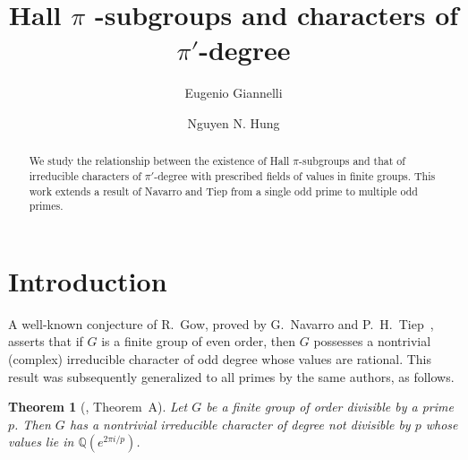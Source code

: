 \documentclass[12pt]{amsart}
\title[Hall $\pi$-subgroups and characters of $\pi'$-degree]{Hall $\pi$%
-subgroups and characters %
of $\pi'$-degree}
\author[Eugenio Giannelli]{Eugenio Giannelli}
\author[Nguyen N. Hung]{Nguyen N. Hung}
\newtheorem{theorem}{Theorem}[section]
\theoremstyle{definition}
\numberwithin{equation}{section}
\newcommand{\QQ}{{\mathbb Q}}
\begin{document}
\begin{abstract}
We study the %
relationship between the existence of Hall
$\pi$-subgroups and that of irreducible characters %
of $\pi'$-degree
with prescribed fields %
of values in finite groups. This %
work extends
a %
result of Navarro and Tiep from a single odd prime to multiple odd
primes.
\end{abstract}

\maketitle



\section{Introduction}

A well-known conjecture of %
R.~Gow, proved by G.~Navarro and
P.~H.~Tiep~\cite{Navarro-Tiep2}, asserts that if $G$ is a finite
group of even order, then $G$ possesses a nontrivial (complex)
irreducible character of odd degree whose values are rational. This
result was subsequently generalized to all primes by the same
authors, as %
follows.

\begin{theorem}[\cite{Navarro-Tiep1}, Theorem~A]\label{thm:Navarro-Tiep}
Let $G$ be a finite group of order divisible by a prime %
$p$. Then
$G$ has a nontrivial irreducible character of degree not divisible
by $p$ whose values lie %
in $\QQ(e^{2\pi i/p})$.
\end{theorem}
\end{document}
